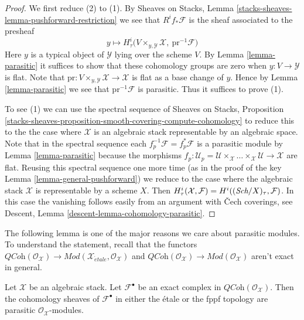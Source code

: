 \begin{proof}
We first reduce (2) to (1).
By Sheaves on Stacks, Lemma \ref{stacks-sheaves-lemma-pushforward-restriction}
we see that $R^if_*\mathcal{F}$ is the sheaf associated to the presheaf
$$
y \longmapsto
H^i_\tau\Big(V \times_{y, \mathcal{Y}} \mathcal{X},
\ \text{pr}^{-1}\mathcal{F}\Big)
$$
Here $y$ is a typical object of $\mathcal{Y}$ lying over the scheme $V$.
By Lemma \ref{lemma-parasitic} it suffices to show that
these cohomology groups are zero when $y : V \to \mathcal{Y}$ is flat.
Note that $\text{pr} : V \times_{y, \mathcal{Y}} \mathcal{X} \to \mathcal{X}$
is flat as a base change of $y$. Hence by
Lemma \ref{lemma-parasitic} we see that $\text{pr}^{-1}\mathcal{F}$
is parasitic. Thus it suffices to prove (1).

\medskip\noindent
To see (1) we can use the spectral sequence of
Sheaves on Stacks, Proposition
\ref{stacks-sheaves-proposition-smooth-covering-compute-cohomology}
to reduce this to the the case where $\mathcal{X}$
is an algebraic stack representable by an algebraic space.
Note that in the spectral sequence each
$f_p^{-1}\mathcal{F} = f_p^*\mathcal{F}$ is a parasitic module by
Lemma \ref{lemma-parasitic} because the morphisms
$f_p : \mathcal{U}_p =
\mathcal{U} \times_\mathcal{X} \ldots
\times_\mathcal{X} \mathcal{U} \to \mathcal{X}$ are flat.
Reusing this spectral sequence one more time (as in the
proof of the key Lemma \ref{lemma-general-pushforward})
we reduce to the case where the
algebraic stack $\mathcal{X}$ is representable by a scheme $X$.
Then $H^i_\tau(\mathcal{X}, \mathcal{F}) = H^i((\textit{Sch}/X)_\tau, \mathcal{F})$.
In this case the vanishing follows easily from an argument
with {\v C}ech coverings, see
Descent, Lemma \ref{descent-lemma-cohomology-parasitic}.
\end{proof}

\noindent
The following lemma is one of the major reasons we care about
parasitic modules. To understand the statement, recall that
the functors
$\textit{QCoh}(\mathcal{O}_\mathcal{X}) \to
\textit{Mod}(\mathcal{X}_{\acute{e}tale}, \mathcal{O}_\mathcal{X})$
and
$\textit{QCoh}(\mathcal{O}_\mathcal{X}) \to
\textit{Mod}(\mathcal{O}_\mathcal{X})$
aren't exact in general.

\begin{lemma}
\label{lemma-exact-sequence-quasi-coherent-parasitic-cohomology}
Let $\mathcal{X}$ be an algebraic stack. Let
$\mathcal{F}^\bullet$ be an
exact complex in $\textit{QCoh}(\mathcal{O}_\mathcal{X})$.
Then the cohomology sheaves of $\mathcal{F}^\bullet$
in either the \'etale or the fppf topology
are parasitic $\mathcal{O}_\mathcal{X}$-modules.
\end{lemma}

